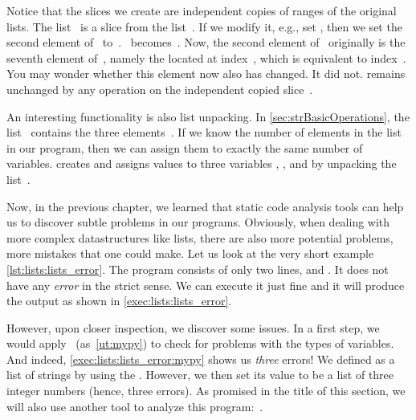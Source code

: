Notice that the slices we create are independent copies of ranges of the original lists.
The list~ is a slice from the list~.
If we modify it, e.g., set , then we set the second element of~ to~.
~becomes~\pythonil{[7, 12, 6]}.
Now, the second element of~ originally is the seventh element of~, namely the  located at index~, which is equivalent to index~.
You may wonder whether this element now also has changed.
It did not.
 remains unchanged by any operation on the independent copied slice~.

An interesting functionality is also list unpacking.
In \cref{sec:strBasicOperations}, the list~ contains the three elements~\pythonil{[5, 6, 7]}.
If we know the number of elements in the list in our program, then we can assign them to exactly the same number of variables.
 creates and assigns values to three variables , , and  by unpacking the list~.%
%
\FloatBarrier%
\endhsection%
%
%
\label{sec:listExampleForErrorsAndRuff}%
%

Now, in the previous chapter, we learned that static code analysis tools can help us to discover subtle problems in our programs.
Obviously, when dealing with more complex datastructures like lists, there are also more potential problems, more mistakes that one could make.
Let us look at the very short example \cref{lst:lists:lists_error}.
The program consists of only two lines,  and .
It does not have any \emph{error} in the strict sense.
We can execute it just fine and it will produce the output \textil{[1, 2, 3]} as shown in \cref{exec:lists:lists_error}.


However, upon closer inspection, we discover some issues.
In a first step, we would apply \mypy~(as~\cref{ut:mypy}) to check for problems with the types of variables.
And indeed, \cref{exec:lists:lists_error:mypy} shows us \emph{three} errors!
We defined  as a list of strings by using the  .
However, we then set its value to be a list of three integer numbers (hence, three errors).
As promised in the title of this section, we will also use another tool to analyze this program:~\ruff.

